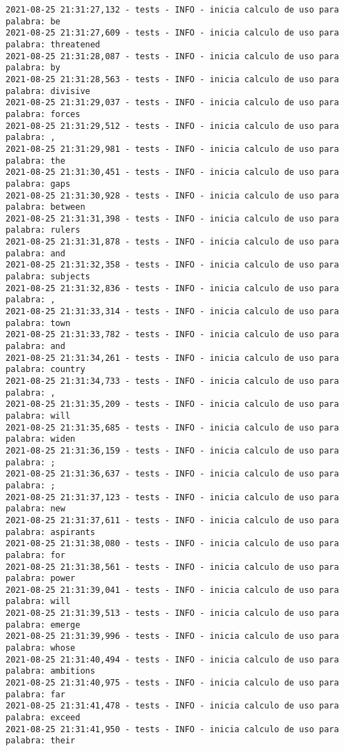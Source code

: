 \documentclass[11pt]{article}
\begin{document}
\begin{verbatim}
2021-08-25 21:31:27,132 - tests - INFO - inicia calculo de uso para palabra: be
2021-08-25 21:31:27,609 - tests - INFO - inicia calculo de uso para palabra: threatened
2021-08-25 21:31:28,087 - tests - INFO - inicia calculo de uso para palabra: by
2021-08-25 21:31:28,563 - tests - INFO - inicia calculo de uso para palabra: divisive
2021-08-25 21:31:29,037 - tests - INFO - inicia calculo de uso para palabra: forces
2021-08-25 21:31:29,512 - tests - INFO - inicia calculo de uso para palabra: ,
2021-08-25 21:31:29,981 - tests - INFO - inicia calculo de uso para palabra: the
2021-08-25 21:31:30,451 - tests - INFO - inicia calculo de uso para palabra: gaps
2021-08-25 21:31:30,928 - tests - INFO - inicia calculo de uso para palabra: between
2021-08-25 21:31:31,398 - tests - INFO - inicia calculo de uso para palabra: rulers
2021-08-25 21:31:31,878 - tests - INFO - inicia calculo de uso para palabra: and
2021-08-25 21:31:32,358 - tests - INFO - inicia calculo de uso para palabra: subjects
2021-08-25 21:31:32,836 - tests - INFO - inicia calculo de uso para palabra: ,
2021-08-25 21:31:33,314 - tests - INFO - inicia calculo de uso para palabra: town
2021-08-25 21:31:33,782 - tests - INFO - inicia calculo de uso para palabra: and
2021-08-25 21:31:34,261 - tests - INFO - inicia calculo de uso para palabra: country
2021-08-25 21:31:34,733 - tests - INFO - inicia calculo de uso para palabra: ,
2021-08-25 21:31:35,209 - tests - INFO - inicia calculo de uso para palabra: will
2021-08-25 21:31:35,685 - tests - INFO - inicia calculo de uso para palabra: widen
2021-08-25 21:31:36,159 - tests - INFO - inicia calculo de uso para palabra: ;
2021-08-25 21:31:36,637 - tests - INFO - inicia calculo de uso para palabra: ;
2021-08-25 21:31:37,123 - tests - INFO - inicia calculo de uso para palabra: new
2021-08-25 21:31:37,611 - tests - INFO - inicia calculo de uso para palabra: aspirants
2021-08-25 21:31:38,080 - tests - INFO - inicia calculo de uso para palabra: for
2021-08-25 21:31:38,561 - tests - INFO - inicia calculo de uso para palabra: power
2021-08-25 21:31:39,041 - tests - INFO - inicia calculo de uso para palabra: will
2021-08-25 21:31:39,513 - tests - INFO - inicia calculo de uso para palabra: emerge
2021-08-25 21:31:39,996 - tests - INFO - inicia calculo de uso para palabra: whose
2021-08-25 21:31:40,494 - tests - INFO - inicia calculo de uso para palabra: ambitions
2021-08-25 21:31:40,975 - tests - INFO - inicia calculo de uso para palabra: far
2021-08-25 21:31:41,478 - tests - INFO - inicia calculo de uso para palabra: exceed
2021-08-25 21:31:41,950 - tests - INFO - inicia calculo de uso para palabra: their

\end{verbatim}
\end{document}
